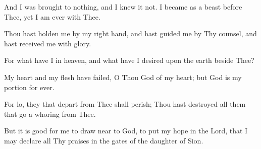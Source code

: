 And I was brought to nothing, and I knew it not. I became as a beast before Thee, yet I am ever with Thee.

Thou hast holden me by my right hand, and hast guided me by Thy counsel, and hast received me with glory.

For what have I in heaven, and what have I desired upon the earth beside Thee?

My heart and my flesh have failed, O Thou God of my heart; but God is my portion for ever.

For lo, they that depart from Thee shall perish; Thou hast destroyed all them that go a whoring from Thee.

But it is good for me to draw near to God, to put my hope in the Lord, that I may declare all Thy praises in the gates of the daughter of Sion.
